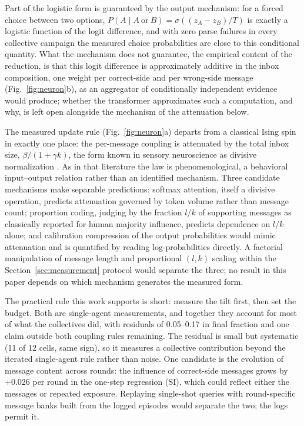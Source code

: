 \documentclass[9pt,twocolumn]{extarticle}
\begin{document}
Part of the logistic form is guaranteed by the output mechanism: for a
forced choice between two options, $P(A \mid A\ \text{or}\ B) =
\sigma((z_A - z_B)/T)$ is exactly a logistic function of the logit
difference, and with zero parse failures in every collective campaign the
measured choice probabilities are close to this conditional quantity. What
the mechanism does not guarantee, the empirical content of the reduction, is
that this logit difference is approximately additive in the inbox
composition, one weight per correct-side and per wrong-side message
(Fig.~\ref{fig:neuron}b), as an aggregator of conditionally independent
evidence would produce; whether the transformer approximates such a
computation, and why, is left open alongside the mechanism of the
attenuation below.

The measured update rule (Fig.~\ref{fig:neuron}a) departs from a classical
Ising spin in exactly one place: the per-message coupling is attenuated by
the total inbox size, $\beta/(1+\gamma k)$, the form known in sensory
neuroscience as divisive normalization \citep{CarandiniHeeger2012}. As in
that literature the law is phenomenological, a behavioral input--output
relation rather than an identified mechanism. Three candidate mechanisms
make separable predictions: softmax attention, itself a divisive operation,
predicts attenuation governed by token volume rather than message count;
proportion coding, judging by the fraction $l/k$ of supporting messages as
classically reported for human majority influence, predicts dependence on
$l/k$ alone; and calibration compression of the output probabilities would
mimic attenuation and is quantified by reading log-probabilities directly. A
factorial manipulation of message length and proportional $(l, k)$ scaling
within the Section~\ref{sec:measurement} protocol would separate the three;
no result in this paper depends on which mechanism generates the measured
form.

The practical rule this work supports is short: measure the tilt first, then
set the budget. Both are single-agent measurements, and together they
account for most of what the collectives did, with residuals of 0.05--0.17 in
final fraction and one claim outside both coupling rules remaining. The
residual is small but systematic (11 of 12 cells, same sign), so it measures
a collective contribution beyond the iterated single-agent rule rather than
noise. One candidate is the evolution of message content across rounds: the
influence of correct-side messages grows by $+0.026$ per round in the
one-step regression (SI), which could reflect either the messages or repeated
exposure. Replaying single-shot queries with round-specific message banks
built from the logged episodes would separate the two; the logs permit it.
\end{document}

